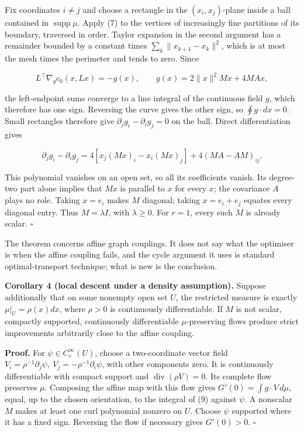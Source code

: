 \documentclass[
  british,
  11pt,
  a4paper,
]{article}
\newcounter{none} %
\begin{document}
Fix coordinates \(i\ne j\) and choose a rectangle in the
\((x_i,x_j)\)-plane inside a ball contained in
\(\operatorname{supp}\mu\). Apply (7) to the vertices of increasingly
fine partitions of its boundary, traversed in order. Taylor expansion in
the second argument has a remainder bounded by a constant times
\(\sum_k\|x_{k+1}-x_k\|^2\), which is at most the mesh times the
perimeter and tends to zero. Since

\[
L^\top\nabla_y c_0(x,Lx)=-g(x),\qquad
g(x)=2\|x\|^2Mx+4MAx,                                          \tag{8}
\]

the left-endpoint sums converge to a line integral of the continuous
field \(g\), which therefore has one sign. Reversing the curve gives the
other sign, so \(\oint g\cdot dx=0\). Small rectangles therefore give
\(\partial_jg_i-\partial_ig_j=0\) on the ball. Direct differentiation
gives

\[
\partial_jg_i-\partial_ig_j
=4[x_j(Mx)_i-x_i(Mx)_j]+4(MA-AM)_{ij}.                           \tag{9}
\]

This polynomial vanishes on an open set, so all its coefficients vanish.
Its degree-two part alone implies that \(Mx\) is parallel to \(x\) for
every \(x\); the covariance \(A\) plays no role. Taking \(x=e_i\) makes
\(M\) diagonal; taking \(x=e_i+e_j\) equates every diagonal entry. Thus
\(M=\lambda I\), with \(\lambda\geq0\). For \(r=1\), every such \(M\) is
already scalar. \(\square\)

The theorem concerns affine graph couplings. It does not say what the
optimiser is when the affine coupling fails, and the cycle argument it
uses is standard optimal-transport technique; what is new is the
conclusion.

\textbf{Corollary 4 (local descent under a density assumption).} Suppose
additionally that on some nonempty open set \(U\), the restricted
measure is exactly \(\mu|_U=\rho(x)dx\), where \(\rho>0\) is
continuously differentiable. If \(M\) is not scalar, compactly
supported, continuously differentiable \(\mu\)-preserving flows produce
strict improvements arbitrarily close to the affine coupling.

\textbf{Proof.} For \(\psi\in C_c^\infty(U)\), choose a two-coordinate
vector field
\(V_i=\rho^{-1}\partial_j\psi,\ V_j=-\rho^{-1}\partial_i\psi\), with
other components zero. It is continuously differentiable with compact
support and \(\operatorname{div}(\rho V)=0\). Its complete flow
preserves \(\mu\). Composing the affine map with this flow gives
\(G'(0)=\int g\cdot V\,d\mu\), equal, up to the chosen orientation, to
the integral of (9) against \(\psi\). A nonscalar \(M\) makes at least
one curl polynomial nonzero on \(U\). Choose \(\psi\) supported where it
has a fixed sign. Reversing the flow if necessary gives \(G'(0)>0\).
\(\square\)
\end{document}

